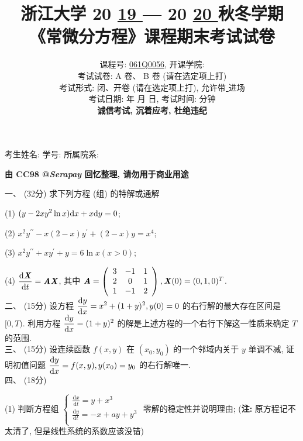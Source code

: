 \documentclass[UTF8]{ctexart}
\title{
\textbf{浙江大学 }20 \underline{ 19 } — 20 \underline{ 20 } \textbf{秋冬学期} \\
\textbf{《常微分方程》课程期末考试试卷}
}
\author{
课程号: \underline{ \quad061Q0056\quad }, 开课学院: \underline{ \quad数学科学学院\quad } \\
考试试卷: \checkmark A 卷、 B 卷 (请在选定项上打\checkmark) \\
考试形式: \checkmark 闭、开卷 (请在选定项上打\checkmark), 允许带\underline{ \quad无\quad  }进场 \\
考试日期: \underline{ \quad2020\quad } 年 \underline{ \quad01\quad } 月 \underline{ \quad09\quad } 日, 考试时间: \underline{ \quad120\quad }分钟 \\
\textbf{诚信考试, 沉着应考, 杜绝违纪}
}
\date{}
\begin{document}
\maketitle
\begin{center}
考生姓名: \underline{\quad\quad\quad\quad\quad\quad\quad\quad\quad} 学号: \underline{\quad\quad\quad\quad\quad\quad\quad\quad\quad} 所属院系: \underline{\quad\quad\quad\quad\quad\quad\quad\quad\quad}
\end{center}

\begin{center}
    \Large{\textbf{由 CC98 @\textit{Serapay} 回忆整理, 请勿用于商业用途}}
\end{center}

一、 (32分) 求下列方程 (组) 的特解或通解

(1) $\displaystyle(y-2xy^2\ln x){\rm d}x+x{\rm d}y=0$;

(2) $\displaystyle x^2y^{\prime\prime}-x(2-x)y^{\prime}+(2-x)y=x^4$;

(3) $x^2y^{\prime\prime}+xy^{\prime}+y=6\ln x(x>0)$;

(4) $\displaystyle\frac{{\rm d}\textbf{\textit{X}}}{{\rm d}t}=\textbf{\textit{AX}}$, 其中 $\textbf{\textit{A}}=
\left(\begin{array}{ccc}
3 & -1 & 1 \\
2 & 0 & 1 \\
1 & -1 & 2
\end{array}\right),\textbf{\textit{X}}(0)=(0,1,0)^T$.
\\

二、 (15分) 设方程 $\displaystyle\frac{{\rm d}y}{{\rm d}x}=x^2+(1+y)^2, y(0)=0$ 的右行解的最大存在区间是 $[0,T)$. 利用方程 $\displaystyle\frac{{\rm d}y}{{\rm d}x}=(1+y)^2$ 的解是上述方程的一个右行下解这一性质来确定 $T$ 的范围.
\\

三、 (15分) 设连续函数 $f(x,y)$ 在 $(x_0,y_0)$ 的一个邻域内关于 $y$ 单调不减, 证明初值问题 $\displaystyle\frac{{\rm d}y}{{\rm d}x}=f(x,y), y(x_0)=y_0$ 的右行解唯一.
\\

四、 (18分)

(1) 判断方程组 $\begin{cases}
	\displaystyle\frac{\text{d}x}{\text{d}t}=y+x^3\\
	\displaystyle\frac{\text{d}y}{\text{d}t}=-x+ay+y^3\\
    \end{cases}$ 零解的稳定性并说明理由; (\textbf{注:} 原方程记不太清了, 但是线性系统的系数应该没错)
\end{document}
